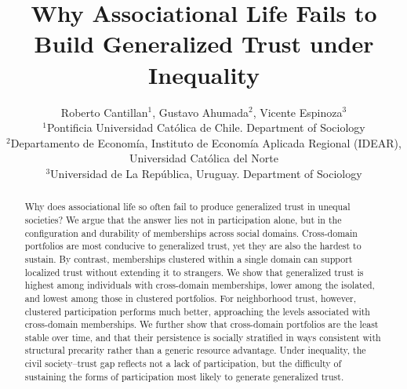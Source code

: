 

\title{Why Associational Life Fails to Build Generalized Trust under Inequality}
\author{Roberto Cantillan$^{1}$, Gustavo Ahumada$^{2}$, Vicente Espinoza$^{3}$ \\
        \small $^{1}$Pontificia Universidad Católica de Chile. Department of Sociology\\
        \small $^{2}$Departamento de Economía, Instituto de Economía Aplicada Regional (IDEAR), Universidad Católica del Norte\\
        \small $^{3}$Universidad de La República, Uruguay. Department of Sociology\\
}


\maketitle

\begin{abstract}
Why does associational life so often fail to produce generalized trust in unequal societies? We argue that the answer lies not in participation alone, but in the configuration and durability of memberships across social domains. Cross-domain portfolios are most conducive to generalized trust, yet they are also the hardest to sustain. By contrast, memberships clustered within a single domain can support localized trust without extending it to strangers. We show that generalized trust is highest among individuals with cross-domain memberships, lower among the isolated, and lowest among those in clustered portfolios. For neighborhood trust, however, clustered participation performs much better, approaching the levels associated with cross-domain memberships. We further show that cross-domain portfolios are the least stable over time, and that their persistence is socially stratified in ways consistent with structural precarity rather than a generic resource advantage. Under inequality, the civil society--trust gap reflects not a lack of participation, but the difficulty of sustaining the forms of participation most likely to generate generalized trust.
\end{abstract}



\hspace{10pt}

\newpage

\maketitle

